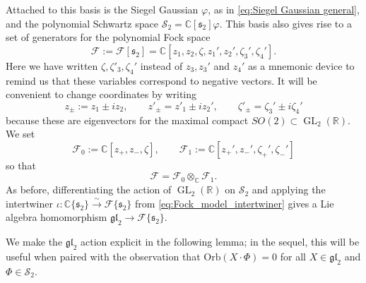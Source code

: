 \documentclass[reqno, 11pt]{amsart} %
\numberwithin{equation}{section}
\theoremstyle{plain}
\theoremstyle{definition}
\theoremstyle{remark}
\newcommand{\mbR}{\mathbb{R}}
\newcommand{\simto}{\overset{\sim}{\to}}
\newcommand{\bbC}{\mathbb C}
\newcommand{\calF}{\mathcal F}
\newcommand{\lie}[1]{ \mathfrak{#1}}
\DeclareMathOperator{\GL}{GL}
\newcommand{\Orb}{\mathrm{Orb}}
\begin{document}
Attached to this basis is the Siegel Gaussian $\varphi$, as in \eqref{eq:Siegel Gaussian general}, and the polynomial Schwartz space $\mathcal S_2 = \mathbb C[\lie{s}_2] \varphi$. 	This basis also gives rise to a set of generators for the polynomial Fock space
\[
\mathcal F := \mathcal F[\lie s_2] = \mathbb C[z_1, z_2, \zeta, z_1', z_2', \zeta_3', \zeta_4'].
\]
Here we have written $\zeta, \zeta'_3, \zeta_4'$ instead of $z_3, z_3'$ and $z_4'$ as a mnemonic device to remind us that these variables correspond to negative vectors.
It will be convenient to change coordinates by writing
\begin{equation}\label{eq:new_Fock_vars}
z_{\pm} := z_1 \pm i z_2, \qquad z'_{\pm} = z'_1 \pm i z_2', \qquad \zeta'_{\pm} = \zeta_3' \pm i \zeta_4'
\end{equation}
because these are eigenvectors for the maximal compact $SO(2)\subset \GL_2(\mbR)$. We set
\begin{equation} \label{eqn:GL2 Fock new coords}
\calF_0 := \bbC[ z_+, z_-, \zeta], \qquad \calF_1 := \bbC[z_+', z_-', \zeta_+', \zeta_-']
\end{equation}
so that
\[
\calF = \calF_0 \otimes_{\bbC} \calF_1.
\]
As before, differentiating the action of $\GL_2(\mathbb R)$ on $\mathcal S_2$ and applying the intertwiner $\iota \colon \bbC\{ \lie s_2\} \simto \calF\{ \lie s_2\}$ from \eqref{eq:Fock_model_intertwiner} gives a Lie algebra homomorphism $\lie{gl}_2 \to \calF\{\lie s_2\}$.

We make the $\lie{gl}_2$ action explicit in the following lemma; in the sequel, this will be useful when paired with the observation that $\Orb(X\cdot Φ) = 0$ for all $X \in \lie{gl}_2$ and $Φ \in \mathcal S_2$.
\end{document}
